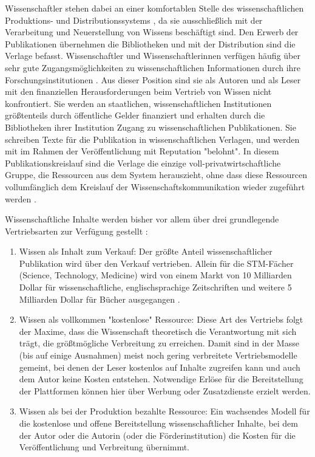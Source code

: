 Wissenschaftler stehen dabei an einer komfortablen Stelle des wissenschaftlichen Produktions- und Distributionssystems \cite{herb_2010}, da sie ausschließlich mit der Verarbeitung und Neuerstellung von Wissens beschäftigt sind. Den Erwerb der Publikationen übernehmen die Bibliotheken und mit der Distribution sind die Verlage befasst. Wissenschaftler und Wissenschaftlerinnen verfügen häufig über sehr gute Zugangsmöglichkeiten zu wissenschaftlichen Informationen durch ihre Forschungsinstitutionen \cite{cope2014future}. Aus dieser Position sind sie als Autoren und als Leser mit den finanziellen Herausforderungen beim Vertrieb von Wissen nicht konfrontiert. Sie werden an staatlichen, wissenschaftlichen Institutionen größtenteils durch öffentliche Gelder finanziert und erhalten durch die Bibliotheken ihrer Institution Zugang zu wissenschaftlichen Publikationen. Sie schreiben Texte für die Publikation in wissenschaftlichen Verlagen, und werden mit im Rahmen der Veröffentlichung mit Reputation "belohnt". In diesem Publikationskreislauf sind die Verlage die einzige voll-privatwirtschaftliche Gruppe, die Ressourcen aus dem System herauszieht, ohne dass diese Ressourcen vollumfänglich dem Kreislauf der Wissenschaftskommunikation wieder zugeführt werden \cite{kiley_2006_open}.

Wissenschaftliche Inhalte werden bisher vor allem über drei grundlegende Vertriebsarten zur Verfügung gestellt \cite{cope2014future}:
\begin{enumerate}
\item Wissen als Inhalt zum Verkauf: Der größte Anteil wissenschaftlicher Publikation wird über den Verkauf vertrieben. Allein für die STM-Fächer (Science, Technology, Medicine) wird von einem Markt von 10 Milliarden Dollar für wissenschaftliche, englischsprachige Zeitschriften und weitere 5 Milliarden Dollar für Bücher ausgegangen \cite[:6]{ware_2015_stm}.
\item Wissen als vollkommen "kostenlose" Ressource: Diese Art des Vertriebs folgt der Maxime, dass die Wissenschaft theoretisch die Verantwortung mit sich trägt, die größtmögliche Verbreitung zu erreichen. Damit sind in der Masse (bis auf einige Ausnahmen) meist noch gering verbreitete Vertriebsmodelle gemeint, bei denen der Leser kostenlos auf Inhalte zugreifen kann und auch dem Autor keine Kosten entstehen. Notwendige Erlöse für die Bereitstellung der Plattformen können hier über Werbung oder Zusatzdienste erzielt werden.
\item Wissen als bei der Produktion bezahlte Ressource: Ein wachsendes Modell für die kostenlose und offene Bereitstellung wissenschaftlicher Inhalte, bei dem der Autor oder die Autorin (oder die Förderinstitution) die Kosten für die Veröffentlichung und Verbreitung übernimmt.
\end{enumerate}

